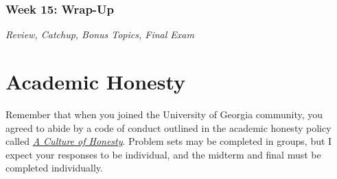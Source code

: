\documentclass[11pt, letterpaper]{article}
\begin{document}
%
%

\subsubsection*{Week 15: Wrap-Up}
\textit{Review, Catchup, Bonus Topics, Final Exam}







\section*{Academic Honesty}
Remember that when you joined the University of Georgia community, you agreed to abide by a code of conduct outlined in the academic honesty policy called \href{https://honesty.uga.edu/Academic-Honesty-Policy/Introduction/}{\textit{A Culture of Honesty}}. Problem sets may be completed in groups, but I expect your responses to be individual, and the midterm and final must be completed individually.
\end{document}
